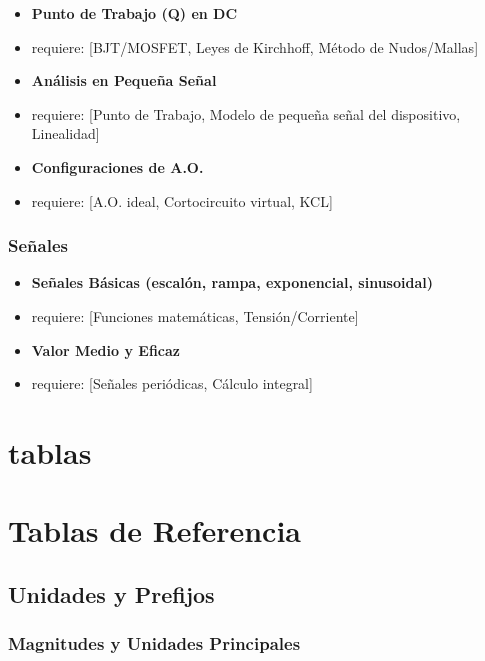 \documentclass[11pt,a4paper]{article}
\begin{document}
\begin{itemize}[leftmargin=*,topsep=2pt,itemsep=1pt]
  \item \textbf{Punto de Trabajo (Q) en DC}
  \item requiere: [BJT/MOSFET, Leyes de Kirchhoff, Método de Nudos/Mallas]
  \item \textbf{Análisis en Pequeña Señal}
  \item requiere: [Punto de Trabajo, Modelo de pequeña señal del dispositivo, Linealidad]
  \item \textbf{Configuraciones de A.O.}
  \item requiere: [A.O. ideal, Cortocircuito virtual, KCL]
\end{itemize}


\subsubsection*{Señales}


\begin{itemize}[leftmargin=*,topsep=2pt,itemsep=1pt]
  \item \textbf{Señales Básicas (escalón, rampa, exponencial, sinusoidal)}
  \item requiere: [Funciones matemáticas, Tensión/Corriente]
  \item \textbf{Valor Medio y Eficaz}
  \item requiere: [Señales periódicas, Cálculo integral]
\end{itemize}


\section*{tablas}

\section*{Tablas de Referencia}


\subsection*{Unidades y Prefijos}


\subsubsection*{Magnitudes y Unidades Principales}
\end{document}
